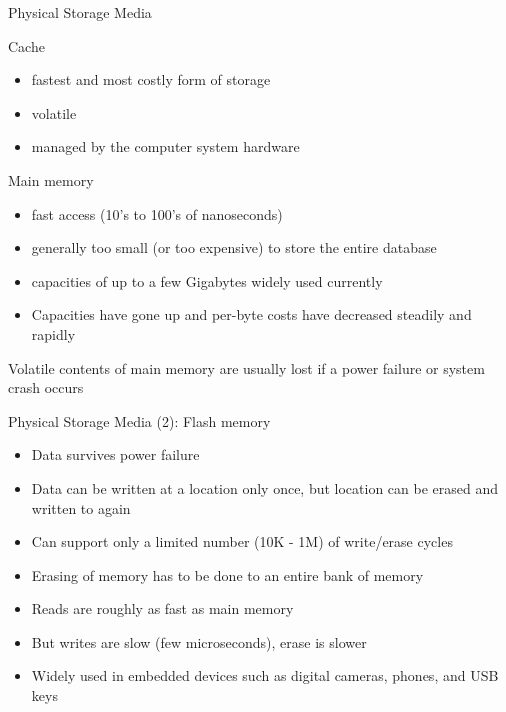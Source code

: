 \documentclass[aspectratio=169, xcolor=dvipsnames]{beamer}
\begin{document}
\begin{frame}{Physical Storage Media}
    \begin{block}{Cache}
        \begin{itemize}[<+->]
            \item fastest and most costly form of storage
            \item volatile
            \item managed by the computer system hardware
        \end{itemize}
    \end{block}
    \begin{block}{Main memory}
        \begin{itemize}[<+->]
            \item fast access (10's to 100's of nanoseconds)
            \item generally too small (or too expensive) to store the entire database
            \item capacities of up to a few Gigabytes widely used currently
            \item Capacities have gone up and per-byte costs have decreased steadily and rapidly
        \end{itemize}
    \end{block}
    \begin{alertblock}{Volatile}
        contents of main memory are usually lost if a power failure or system crash occurs
    \end{alertblock}
\end{frame}

\begin{frame}{Physical Storage Media (2): Flash memory}
    \begin{block}{}
        \begin{itemize}[<+->]
            \item Data survives power failure
            \item Data can be written at a location only once, but location can be erased and written to again
            \item Can support only a limited number (10K - 1M) of write/erase cycles
            \item Erasing of memory has to be done to an entire bank of memory
            \item Reads are roughly as fast as main memory
            \item But writes are slow (few microseconds), erase is slower
            \item Widely used in embedded devices such as digital cameras, phones, and USB keys
        \end{itemize}
    \end{block}
\end{frame}
\end{document}
